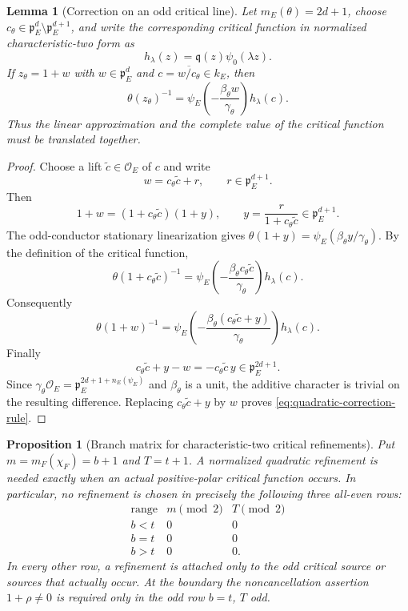 \documentclass[11pt]{amsart}
\newtheorem{proposition}[theorem]{Proposition}
\newtheorem{lemma}[theorem]{Lemma}
\theoremstyle{definition}
\theoremstyle{remark}
\newcommand{\cO}{\mathcal O}
\newcommand{\p}{\mathfrak p}
\begin{document}
\begin{lemma}[Correction on an odd critical line]
\label{lem:quadratic-correction-rule}
Let $m_E(\theta)=2d+1$, choose
$c_\theta\in\p_E^d\setminus\p_E^{d+1}$, and write the corresponding
critical function in normalized characteristic-two form as
\[
 h_\lambda(z)=\mathfrak q(z)\psi_0(\lambda z).
\]
If $z_\theta=1+w$ with $w\in\p_E^d$ and
$c=\overline{w/c_\theta}\in k_E$, then
\begin{equation}\label{eq:quadratic-correction-rule}
 \theta(z_\theta)^{-1}
 =\psi_E\!\left(-\frac{\beta_\theta w}{\gamma_\theta}\right)
  h_\lambda(c).
\end{equation}
Thus the linear approximation and the complete value of the critical
function must be translated together.
\end{lemma}

\begin{proof}
Choose a lift $\widetilde c\in\cO_E$ of $c$ and write
\[
 w=c_\theta\widetilde c+r,
 \qquad r\in\p_E^{d+1}.
\]
Then
\[
 1+w=(1+c_\theta\widetilde c)(1+y),
 \qquad
 y=\frac{r}{1+c_\theta\widetilde c}\in\p_E^{d+1}.
\]
The odd-conductor stationary linearization gives
$\theta(1+y)=\psi_E(\beta_\theta y/\gamma_\theta)$.  By the definition
of the critical function,
\[
 \theta(1+c_\theta\widetilde c)^{-1}
 =\psi_E\!\left(-\frac{\beta_\theta c_\theta
                              \widetilde c}{\gamma_\theta}\right)
  h_\lambda(c).
\]
Consequently
\[
 \theta(1+w)^{-1}
 =\psi_E\!\left(-\frac{\beta_\theta
              (c_\theta\widetilde c+y)}{\gamma_\theta}\right)
  h_\lambda(c).
\]
Finally
\[
 c_\theta\widetilde c+y-w
 =-c_\theta\widetilde c\,y\in\p_E^{2d+1}.
\]
Since $\gamma_\theta\cO_E=\p_E^{2d+1+n_E(\psi_E)}$ and
$\beta_\theta$ is a unit, the additive character is trivial on the
resulting difference.  Replacing
$c_\theta\widetilde c+y$ by $w$ proves
\eqref{eq:quadratic-correction-rule}.
\end{proof}


\begin{proposition}[Branch matrix for characteristic-two critical refinements]
\label{prop:quadratic-refinement-branch-matrix}
Put $m=m_F(\chi_F)=b+1$ and $T=t+1$.  A normalized quadratic
refinement is needed exactly when an actual positive-polar critical
function occurs.  In particular, no refinement is chosen in precisely
the following three all-even rows:
\begin{equation}\label{eq:quadratic-all-even-rows}
 \begin{array}{c|c|c}
  \text{range}&m\pmod2&T\pmod2\\ \hline
  b<t&0&0\\
  b=t&0&0\\
  b>t&0&0.
 \end{array}
\end{equation}
In every other row, a refinement is attached only to the odd critical
source or sources that actually occur.  At the boundary the
noncancellation assertion $1+\rho\ne0$ is required only in the odd row
$b=t$, $T$ odd.
\end{proposition}
\end{document}
